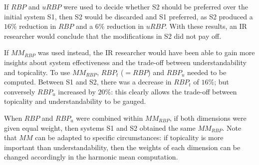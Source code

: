 If $RBP$ and $uRBP$ were used to decide whether S2 should be preferred over the initial system S1, then S2 would be discarded and S1 preferred, as S2 produced a $16\%$ reduction in $RBP$ and a $6\%$ reduction in $uRBP$. With these results, an IR researcher would conclude that the modifications in S2 did not pay off.

If $MM_{RBP}$ was used instead, the IR researcher would have been able to gain more insights about system effectiveness and the trade-off between understandability and topicality. To use $MM_{RBP}$, $RBP_t$ ($=RBP$) and $RBP_u$ needed to be computed. Between S1 and S2, there was a decrease in $RBP_t$ of $16\%$; but conversely $RBP_u$ increased by $20\%$: this clearly allows the trade-off between topicality and understandability to be gauged. 

When $RBP$ and $RBP_u$ were combined within $MM_{RBP}$, if both dimensions were given equal weight, then systems S1 and S2 obtained the same $MM_{RBP}$. Note that $MM$ can be adapted to specific circumstances: if topicality is more important than understandability, then the weights of each dimension can be changed accordingly in the harmonic mean computation. 


